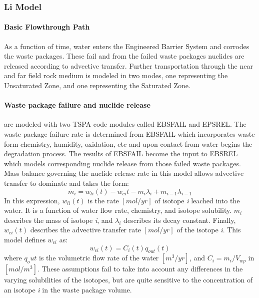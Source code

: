 \subsubsection{Li Model\cite{li_methodology_2006}}

\paragraph{Basic Flowthrough Path}
As a function of time, water enters the Engineered Barrier System and corrodes the waste packages.  
These fail and from the failed waste packages nuclides are released according to advective transfer.  
Further transportation through the near and far field rock medium is modeled in two modes, one 
representing the Unsaturated Zone, and one representing the Saturated Zone.

\paragraph{Waste package failure and nuclide release} are modeled with two TSPA code modules called 
EBSFAIL and EPSREL. The waste package failure rate is determined from EBSFAIL which incorporates 
waste form chemistry, humidity, oxidation, etc and upon contact from water begins the degradation 
process. The results of EBSFAIL become the input to EBSREL which models corresponding nuclide 
release from those failed waste packages. Mass balance governing the nuclide release rate in this 
model allows advective transfer to dominate and takes the form:
\begin{equation}
\dot{m_i}=w_{li}(t)-w_{ci}{t}-m_i\lambda_i+m_{i-1}\lambda_{i-1}\nonumber
\end{equation}
In this expression, $w_{li}(t)$ is the rate $[mol/yr]$ of isotope \emph{i} leached into the water.  
It is a function of water flow rate, chemistry, and isotope solubility. $m_i$ describes the mass of 
isotope \emph{i}, and $\lambda_i$ describes its decay constant. Finally, $w_{ci}(t)$ describes the 
advective transfer rate $[mol/yr]$ of the isotope \emph{i}. This model defines $w_{ci}$ as:
\begin{equation}
w_{ci}(t)=C_i(t)q_{out}(t)
\end{equation} where $q_out$ is the volumetric flow rate of the water $[m^3/yr]$, and $C_i = 
m_i/V_{wp}$ in $[mol/m^3]$. These assumptions fail to take into account any differences in the 
varying solubilities of the isotopes, but are quite sensitive to the concentration of an isotope 
\emph{i} in the waste package volume.  

